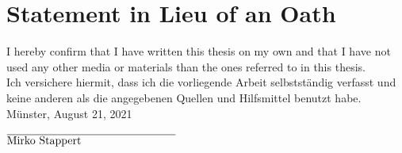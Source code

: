 \chapter*{Statement in Lieu of an Oath}
I hereby confirm that I have written this thesis on my own and that I have not used any other media or materials than the ones referred to in this thesis.\\[0.5cm]
Ich versichere hiermit, dass ich die vorliegende Arbeit selbstst\"andig verfasst und keine anderen als die angegebenen Quellen und Hilfsmittel benutzt habe.\\[1.5cm]

\noindent M\"unster, August 21, 2021
\begin{flushright}
  $\overline{\mbox{Mirko Stappert}\makebox[3cm]{}}$
\end{flushright}

